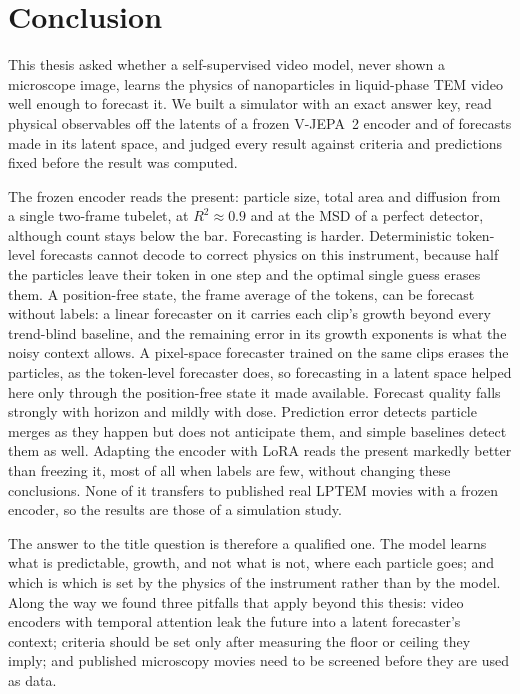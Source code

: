 \section{Conclusion}
\label{sec:conclusion}

This thesis asked whether a self-supervised video model, never shown a microscope image,
learns the physics of nanoparticles in liquid-phase TEM video well enough to forecast it.
We built a simulator with an exact answer key, read physical observables off the latents
of a frozen V-JEPA~2 encoder and of forecasts made in its latent space, and judged every
result against criteria and predictions fixed before the result was computed.

The frozen encoder reads the present: particle size, total area and diffusion from a
single two-frame tubelet, at $R^2 \approx 0.9$ and at the MSD of a perfect detector,
although count stays below the bar. Forecasting is harder. Deterministic token-level
forecasts cannot decode to correct physics on this instrument, because half the
particles leave their token in one step and the optimal single guess erases them. A
position-free state, the frame average of the tokens, can be forecast without labels: a
linear forecaster on it carries each clip's growth beyond every trend-blind baseline, and
the remaining error in its growth exponents is what the noisy context allows. A
pixel-space forecaster trained on the same clips erases the particles, as the token-level
forecaster does, so forecasting in a latent space helped here only through the
position-free state it made available. Forecast
quality falls strongly with horizon and mildly with dose. Prediction error detects
particle merges as they happen but does not anticipate them, and simple baselines detect
them as well. Adapting the encoder with LoRA reads the present markedly better than
freezing it, most of all when labels are few, without changing these conclusions. None of
it transfers to published real LPTEM movies with a frozen encoder, so the results are
those of a simulation study.

The answer to the title question is therefore a qualified one. The model learns what is
predictable, growth, and not what is not, where each particle goes; and which is which is
set by the physics of the instrument rather than by the model. Along the way we found
three pitfalls that apply beyond this thesis: video encoders with temporal attention leak
the future into a latent forecaster's context; criteria should be set only after
measuring the floor or ceiling they imply; and published microscopy movies need to be
screened before they are used as data.
